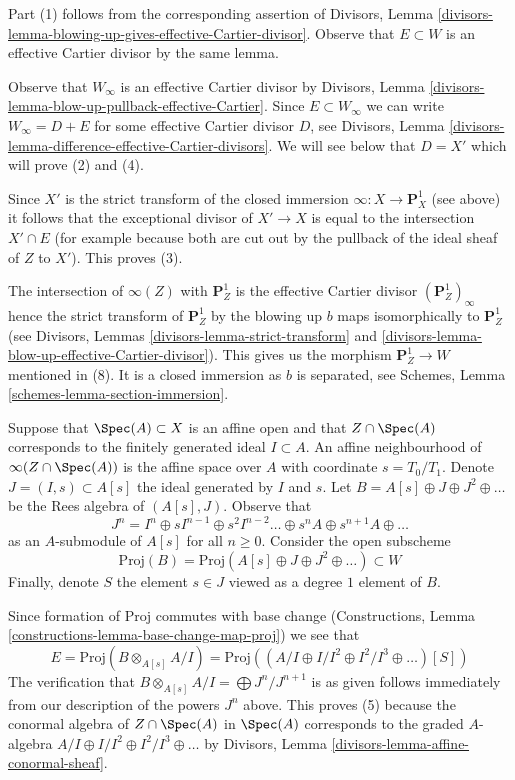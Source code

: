 \medskip\noindent
Part (1) follows from the corresponding assertion of Divisors, Lemma
\ref{divisors-lemma-blowing-up-gives-effective-Cartier-divisor}.
Observe that $E \subset W$ is an effective Cartier divisor by the same lemma.

\medskip\noindent
Observe that $W_\infty$ is an effective Cartier divisor by
Divisors, Lemma \ref{divisors-lemma-blow-up-pullback-effective-Cartier}.
Since $E \subset W_\infty$ we can write $W_\infty = D + E$ for some
effective Cartier divisor $D$, see
Divisors, Lemma \ref{divisors-lemma-difference-effective-Cartier-divisors}.
We will see below that $D = X'$ which will prove (2) and (4).

\medskip\noindent
Since $X'$ is the strict transform of the closed immersion
$\infty : X \to \mathbf{P}^1_X$ (see above) it follows that the exceptional
divisor of $X' \to X$ is equal to the intersection $X' \cap E$
(for example because both are cut out by the pullback of the
ideal sheaf of $Z$ to $X'$). This proves (3).

\medskip\noindent
The intersection of $\infty(Z)$ with $\mathbf{P}^1_Z$ is the effective
Cartier divisor $(\mathbf{P}^1_Z)_\infty$ hence the strict transform
of $\mathbf{P}^1_Z$ by the blowing up $b$ maps isomorphically to
$\mathbf{P}^1_Z$ (see Divisors, Lemmas \ref{divisors-lemma-strict-transform}
and \ref{divisors-lemma-blow-up-effective-Cartier-divisor}).
This gives us the morphism $\mathbf{P}^1_Z \to W$ mentioned in (8).
It is a closed immersion as $b$ is separated, see
Schemes, Lemma \ref{schemes-lemma-section-immersion}.

\medskip\noindent
Suppose that $\Spec(A) \subset X$ is an affine open and that $Z \cap \Spec(A)$
corresponds to the finitely generated ideal $I \subset A$.
An affine neighbourhood of $\infty(Z \cap \Spec(A))$ is the
affine space over $A$ with coordinate $s = T_0/T_1$. Denote
$J = (I, s) \subset A[s]$ the ideal generated by $I$ and $s$.
Let $B = A[s] \oplus J \oplus J^2 \oplus \ldots$ be the Rees algebra
of $(A[s], J)$. Observe that
$$
J^n =
I^n \oplus sI^{n - 1} \oplus s^2I^{n - 2} \ldots \oplus s^nA
\oplus s^{n + 1}A \oplus \ldots
$$
as an $A$-submodule of $A[s]$ for all $n \geq 0$. Consider the open subscheme
$$
\text{Proj}(B) = \text{Proj}(A[s] \oplus J \oplus J^2 \oplus \ldots)
\subset W
$$
Finally, denote $S$ the element $s \in J$ viewed as a degree $1$ element
of $B$.

\medskip\noindent
Since formation of $\text{Proj}$ commutes with base change
(Constructions, Lemma \ref{constructions-lemma-base-change-map-proj})
we see that
$$
E = \text{Proj}(B \otimes_{A[s]} A/I) =
\text{Proj}((A/I \oplus I/I^2 \oplus I^2/I^3 \oplus \ldots)[S])
$$
The verification that $B \otimes_{A[s]} A/I = \bigoplus J^n/J^{n + 1}$
is as given
follows immediately from our description of the powers $J^n$ above.
This proves (5) because the conormal algebra of $Z \cap \Spec(A)$
in $\Spec(A)$ corresponds to the graded $A$-algebra
$A/I \oplus I/I^2 \oplus I^2/I^3 \oplus \ldots$ by
Divisors, Lemma \ref{divisors-lemma-affine-conormal-sheaf}.

